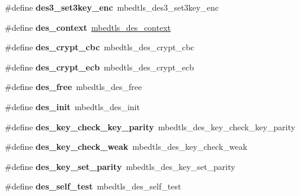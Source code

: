 \begin{DoxyCompactItemize}
\#define {\bfseries des3\+\_\+set3key\+\_\+enc}~mbedtls\+\_\+des3\+\_\+set3key\+\_\+enc
\item 
\mbox{\label{compat-1_83_8h_a477863689966e5166e3c3c80fb4aa198}} 
\#define {\bfseries des\+\_\+context}~\mbox{\hyperlink{structmbedtls__des__context}{mbedtls\+\_\+des\+\_\+context}}
\item 
\mbox{\label{compat-1_83_8h_acba03e7b81d5a0653f69daa1a5a298a7}} 
\#define {\bfseries des\+\_\+crypt\+\_\+cbc}~mbedtls\+\_\+des\+\_\+crypt\+\_\+cbc
\item 
\mbox{\label{compat-1_83_8h_aa9f2681f501773dfac6fb3a11cf982e3}} 
\#define {\bfseries des\+\_\+crypt\+\_\+ecb}~mbedtls\+\_\+des\+\_\+crypt\+\_\+ecb
\item 
\mbox{\label{compat-1_83_8h_a32844958d49abfd013985b6ad983db0c}} 
\#define {\bfseries des\+\_\+free}~mbedtls\+\_\+des\+\_\+free
\item 
\mbox{\label{compat-1_83_8h_a653d9b4473aadb78ef176d49dc117d4d}} 
\#define {\bfseries des\+\_\+init}~mbedtls\+\_\+des\+\_\+init
\item 
\mbox{\label{compat-1_83_8h_a1022f937854f6989a1b36362bc21317b}} 
\#define {\bfseries des\+\_\+key\+\_\+check\+\_\+key\+\_\+parity}~mbedtls\+\_\+des\+\_\+key\+\_\+check\+\_\+key\+\_\+parity
\item 
\mbox{\label{compat-1_83_8h_ad8ac7b8b7c9ea3d821f95fb646d3d870}} 
\#define {\bfseries des\+\_\+key\+\_\+check\+\_\+weak}~mbedtls\+\_\+des\+\_\+key\+\_\+check\+\_\+weak
\item 
\mbox{\label{compat-1_83_8h_a32ef5dedbc6d31474d550c2229b54953}} 
\#define {\bfseries des\+\_\+key\+\_\+set\+\_\+parity}~mbedtls\+\_\+des\+\_\+key\+\_\+set\+\_\+parity
\item 
\mbox{\label{compat-1_83_8h_a14ad01ffabf42d22c89bc80db0dde496}} 
\#define {\bfseries des\+\_\+self\+\_\+test}~mbedtls\+\_\+des\+\_\+self\+\_\+test
\item 
\mbox{\label{compat-1_83_8h_a4ed9162947f2c144b49e76a4e67116d9}} 

\end{DoxyCompactItemize}
